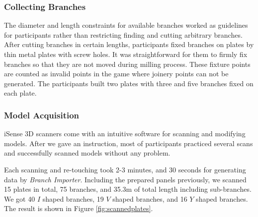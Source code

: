 \subsubsection*{Collecting Branches}
The diameter and length constraints for available branches worked as guidelines for participants rather than restricting finding and cutting arbitrary branches.
After cutting branches in certain lengths, participants fixed branches on plates by thin metal plates with screw holes.
It was straightforward for them to firmly fix branches so that they are not moved during milling process.
These fixture points are counted as invalid points in the game where joinery points can not be generated.
The participants built two plates with three and five branches fixed on each plate.

\subsubsection*{Model Acquisition}
iSense 3D scanners come with an intuitive software for scanning and modifying models.
After we gave an instruction, most of participants practiced several scans and successfully scanned models without any problem.

Each scanning and re-touching took 2-3 minutes, and 30 seconds for generating data by \textit{Branch Importer}.
Including the prepared panels previously, we scanned 15 plates in total, 75 branches, and 35.3m of total length including sub-branches. 
We got 40 $I$ shaped branches, 19 $V$ shaped branches, and 16 $Y$ shaped branches.
The result is shown in Figure \ref{fig:scannedplates}.

